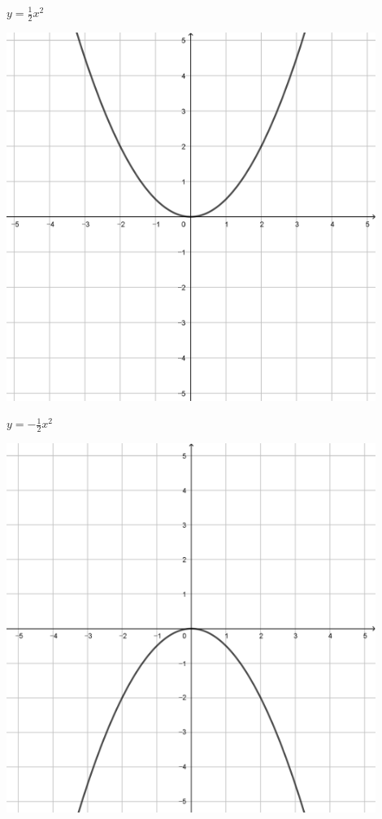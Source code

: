 \documentclass[a4paper]{oblivoir}
\begin{document}
\begin{minipage}{0.45\textwidth}\centering
\(y=\frac12x^2\)
\par\bigskip\includegraphics[width=0.9\textwidth]{img/2_quadratic_7}
\end{minipage}
\begin{minipage}{0.45\textwidth}\centering
\(y=-\frac12x^2\)
\par\bigskip\includegraphics[width=0.9\textwidth]{img/2_quadratic_8}
\end{minipage}\bigskip\bigskip\par
\end{document}
